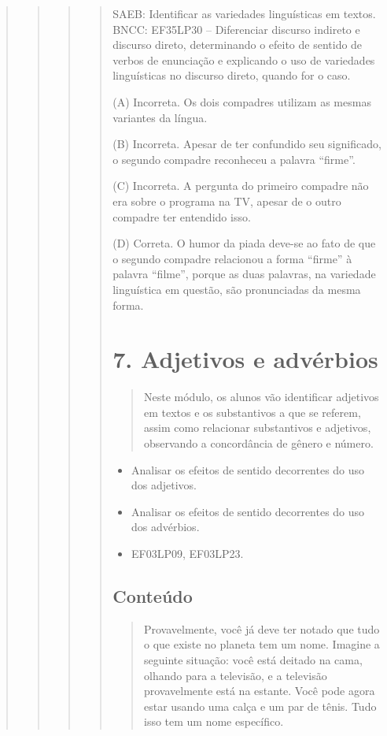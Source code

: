 \begin{quote}
\begin{quote}
\begin{quote}
\begin{quote}
SAEB: Identificar as variedades linguísticas em textos.
BNCC: EF35LP30 -- Diferenciar discurso indireto e discurso direto,
determinando o efeito de sentido de verbos de enunciação e explicando o
uso de variedades linguísticas no discurso direto, quando for o caso.

(A) Incorreta. Os dois compadres utilizam as mesmas variantes da língua.

(B) Incorreta. Apesar de ter confundido seu significado, o segundo compadre reconheceu a palavra ``firme''.

(C) Incorreta. A pergunta do primeiro compadre não era sobre o programa na TV, apesar de o outro compadre ter entendido isso.

(D) Correta. O humor da piada deve-se ao fato de que o segundo compadre relacionou a forma ``firme'' à palavra ``filme'', porque as duas palavras, na variedade linguística em questão, são pronunciadas da mesma forma.

\section{7. Adjetivos e advérbios}\label{muxf3dulo-7}

\begin{quote}
Neste módulo, os alunos vão identificar adjetivos em textos e os
substantivos a que se referem, assim como relacionar substantivos e
adjetivos, observando a concordância de gênero e número.
\end{quote}


\begin{itemize}
  \item Analisar os efeitos de sentido decorrentes do uso dos adjetivos.
  \item Analisar os efeitos de sentido decorrentes do uso dos advérbios.
\end{itemize}


\begin{itemize}
  \item EF03LP09, EF03LP23.
\end{itemize}

\subsection{Conteúdo}\label{conteuxfado-6}

\begin{quote}
Provavelmente, você já deve ter notado que tudo o que existe no planeta
tem um nome. Imagine a seguinte situação: você está deitado na cama,
olhando para a televisão, e a televisão provavelmente está na
estante. Você pode agora estar usando uma calça e um par de tênis.
Tudo isso tem um nome específico.


\end{quote}
\end{quote}
\end{quote}
\end{quote}
\end{quote}
